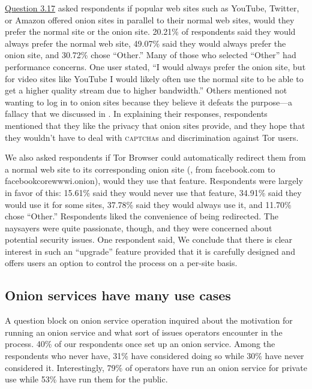\hyperref[q3_17]{Question 3.17} asked respondents if popular web sites such as
YouTube, Twitter, or Amazon offered onion sites in parallel to their normal web
sites, would they prefer the normal site or the onion site. 20.21\% of
respondents said they would always prefer the normal web site, 49.07\% said they
would always prefer the onion site, and 30.72\% chose ``Other.'' Many of those
who selected ``Other'' had performance concerns.  One user stated, ``I would
always prefer the onion site, but for video sites like YouTube I would likely
often use the normal site to be able to get a higher quality stream due to
higher bandwidth.'' Others mentioned not wanting to log in to onion sites
because they believe it defeats the purpose---a fallacy that we discussed in
.  In explaining their responses, respondents mentioned
that they like the privacy that onion sites provide, and they hope that they
wouldn't have to deal with \textsc{captcha}s and discrimination against Tor
users.

We also asked respondents if Tor Browser could automatically redirect them from
a normal web site to its corresponding onion site (\eg, from facebook.com to
facebookcorewwwi.onion), would they use that feature. Respondents were largely
in favor of this: 15.61\% said they would never use that feature, 34.91\% said
they would use it for some sites, 37.78\% said they would always use it, and
11.70\% chose ``Other.'' Respondents liked the convenience of being redirected.
The naysayers were quite passionate, though, and they were concerned about
potential security issues. One respondent said,
We conclude that there is clear interest in such an ``upgrade'' feature provided
that it is carefully designed and offers users an option to control the process
on a per-site basis.

\subsection{Onion services have many use cases}
\label{sec:operation}

A question block on onion service operation inquired about the motivation for
running an onion service and what sort of issues operators encounter in the
process.  40\% of our respondents once set up an onion service.  Among the
respondents who never have, 31\% have considered doing so while 30\% have never
considered it.  Interestingly, 79\% of operators have run an onion service for
private use while 53\% have run them for the public.

